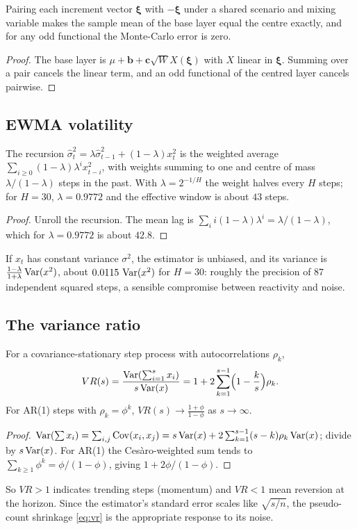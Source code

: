 \begin{proposition}
Pairing each increment vector $\bm\xi$ with $-\bm\xi$ under a shared scenario and mixing variable makes the sample mean of the base layer equal the
centre exactly, and for any odd functional the Monte-Carlo error is zero.
\end{proposition}
\begin{proof}
The base layer is $\mu+\bm b+\bm c\sqrt W X(\bm\xi)$ with $X$ linear in $\bm\xi$. Summing over a pair cancels the linear term, and an odd functional
of the centred layer cancels pairwise.
\end{proof}

\subsection{EWMA volatility}

\begin{lemma}
The recursion $\hat\sigma^2_t=\lambda\hat\sigma^2_{t-1}+(1-\lambda)x_t^2$ is the weighted average $\sum_{i\ge0}(1-\lambda)\lambda^ix_{t-i}^2$, with
weights summing to one and centre of mass $\lambda/(1-\lambda)$ steps in the past. With $\lambda=2^{-1/H}$ the weight halves every $H$ steps; for
$H=30$, $\lambda=0.9772$ and the effective window is about $43$ steps.
\end{lemma}
\begin{proof}
Unroll the recursion. The mean lag is $\sum_i i(1-\lambda)\lambda^i=\lambda/(1-\lambda)$, which for $\lambda=0.9772$ is about $42.8$.
\end{proof}
If $x_t$ has constant variance $\sigma^2$, the estimator is unbiased, and its variance is $\frac{1-\lambda}{1+\lambda}\operatorname{Var}(x^2)$, about
$0.0115\,\operatorname{Var}(x^2)$ for $H=30$: roughly the precision of $87$ independent squared steps, a sensible compromise between reactivity and noise.

\subsection{The variance ratio}

\begin{proposition}
For a covariance-stationary step process with autocorrelations $\rho_k$,
\begin{equation}
  VR(s)=\frac{\operatorname{Var}(\sum_{i=1}^sx_i)}{s\operatorname{Var}(x)}=1+2\sum_{k=1}^{s-1}\Bigl(1-\frac ks\Bigr)\rho_k .
\end{equation}
For AR(1) steps with $\rho_k=\phi^k$, $VR(s)\to\frac{1+\phi}{1-\phi}$ as $s\to\infty$.
\end{proposition}
\begin{proof}
$\operatorname{Var}(\sum x_i)=\sum_{i,j}\operatorname{Cov}(x_i,x_j)=s\operatorname{Var}(x)+2\sum_{k=1}^{s-1}(s-k)\rho_k\operatorname{Var}(x)$; divide by $s\operatorname{Var}(x)$. For AR(1) the Ces\`aro-weighted sum
tends to $\sum_{k\ge1}\phi^k=\phi/(1-\phi)$, giving $1+2\phi/(1-\phi)$.
\end{proof}
So $VR>1$ indicates trending steps (momentum) and $VR<1$ mean reversion at the horizon. Since the estimator's standard error scales like
$\sqrt{s/n}$, the pseudo-count shrinkage \eqref{eq:vr} is the appropriate response to its noise.

